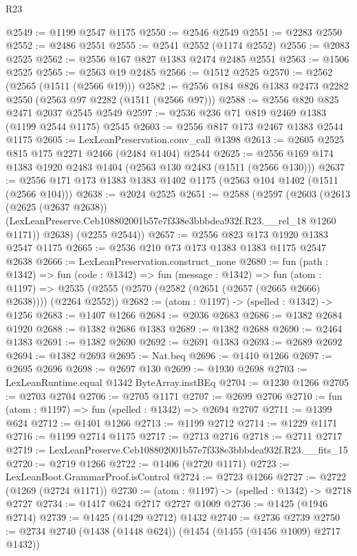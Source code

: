 \begin{lexlean}{R23}
\begin{coremodule}
@2549 := @1199 @2547 @1175
@2550 := @2546 @2549
@2551 := @2283 @2550
@2552 := @2486 @2551
@2555 := @2541 @2552 (@1174 @2552)
@2556 := @2083 @2525
@2562 := @2556 @167 @827 @1383 @2474 @2485 @2551
@2563 := @1506 @2525
@2565 := @2563 @19 @2485
@2566 := @1512 @2525
@2570 := @2562 (@2565 (@1511 (@2566 @19)))
@2582 := @2556 @184 @826 @1383 @2473 @2282 @2550 (@2563 @97 @2282 (@1511 (@2566 @97)))
@2588 := @2556 @820 @825 @2471 @2037 @2545 @2549
@2597 := @2536 @236 @71 @819 @2469 @1383 (@1199 @2544 @1175) @2545
@2603 := @2556 @817 @173 @2467 @1383 @2544 @1175
@2605 := LexLeanPreservation.conv_call @1398
@2613 := @2605 @2525 @815 @175 @2271 @2466 (@2484 @1404) @2544
@2625 := @2556 @169 @174 @1383 @1920 @2483 @1404 (@2563 @130 @2483 (@1511 (@2566 @130)))
@2637 := @2556 @171 @173 @1383 @1383 @1402 @1175 (@2563 @104 @1402 (@1511 (@2566 @104)))
@2638 := @2024 @2525
@2651 := @2588
    (@2597
      (@2603
        (@2613
          (@2625 (@2637 @2638))
          (LexLeanPreserve.Ceb108802001b57e7f338e3bbbdea932f.R23.__rel_18 @1260 @1171))
        @2638)
      (@2255 @2544))
@2657 := @2556 @823 @173 @1920 @1383 @2547 @1175
@2665 := @2536 @210 @73 @173 @1383 @1383 @1175 @2547 @2638
@2666 := LexLeanPreservation.construct_none
@2680 := fun (path : @1342) =>
  fun (code : @1342) =>
  fun (message : @1342) =>
  fun (atom : @1197) =>
  @2535 (@2555 (@2570 (@2582 (@2651 (@2657 (@2665 @2666) @2638)))) (@2264 @2552))
@2682 := (atom : @1197) -> (spelled : @1342) -> @1256
@2683 := @1407 @1266
@2684 := @2036 @2683
@2686 := @1382 @2684 @1920
@2688 := @1382 @2686 @1383
@2689 := @1382 @2688
@2690 := @2464 @1383
@2691 := @1382 @2690
@2692 := @2691 @1383
@2693 := @2689 @2692
@2694 := @1382 @2693
@2695 := Nat.beq
@2696 := @1410 @1266
@2697 := @2695 @2696
@2698 := @2697 @130
@2699 := @1930 @2698
@2703 := LexLeanRuntime.equal @1342 ByteArray.instBEq
@2704 := @1230 @1266
@2705 := @2703 @2704
@2706 := @2705 @1171
@2707 := @2699 @2706
@2710 := fun (atom : @1197) => fun (spelled : @1342) => @2694 @2707
@2711 := @1399 @624
@2712 := @1401 @1266
@2713 := @1199 @2712
@2714 := @1229 @1171
@2716 := @1199 @2714 @1175
@2717 := @2713 @2716
@2718 := @2711 @2717
@2719 := LexLeanPreserve.Ceb108802001b57e7f338e3bbbdea932f.R23.__fits_15
@2720 := @2719 @1266
@2722 := @1406 (@2720 @1171)
@2723 := LexLeanBoot.GrammarProof.isControl
@2724 := @2723 @1266
@2727 := @2722 (@1269 (@2724 @1171))
@2730 := (atom : @1197) -> (spelled : @1342) -> @2718 @2727
@2734 := @1417 @624 @2717 @2727 @1009
@2736 := @1425 (@1946 @2714)
@2739 := @1425 (@1429 @2712) @1432
@2740 := @2736 @2739
@2750 := @2734 @2740 (@1438 (@1448 @624)) (@1454 (@1455 (@1456 @1009) @2717 @1432))

\end{coremodule}
\end{lexlean}

